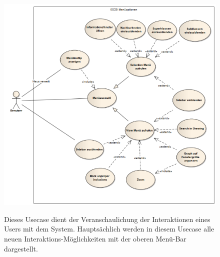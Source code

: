 \documentclass[10pt,a4paper]{article}
\begin{document}
\begin{figure}[htp]
	\begin{center}
		\includegraphics[width=13cm]{Menueoptionen.PNG}\\
	\end{center}
	\caption{Dieses Usecase dient der Veranschaulichung der Interaktionen eines Users mit dem System. Hauptsächlich werden in diesem Usecase alle neuen Interaktions-Möglichkeiten mit der oberen Menü-Bar dargestellt.}
	\label{fig:figure1}
\end{figure}
\newpage
\end{document}
